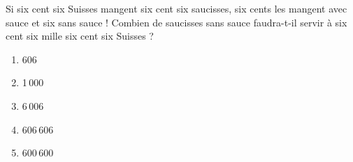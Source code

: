 Si six cent six Suisses mangent six cent six saucisses, six cents les mangent avec sauce et six sans sauce ! Combien de saucisses sans sauce faudra-t-il servir à six cent six mille six cent six Suisses ?
\begin{multicols}{5}
  \begin{enumerate}[A/]
  \item 606
  \item 1\,000
  \item 6\,006
  \item 606\,606
  \item 600\,600
  \end{enumerate}
\end{multicols}